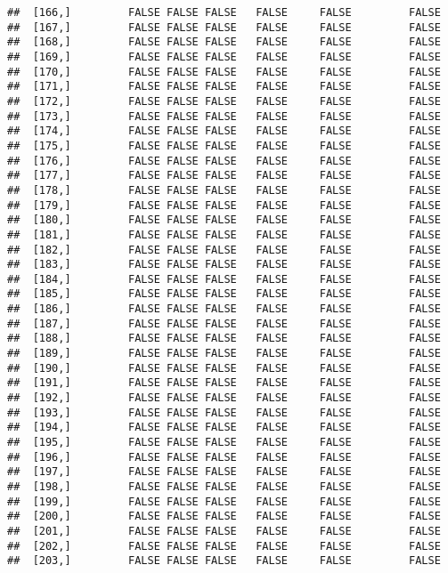 \documentclass[
]{article}
\begin{document}
\begin{verbatim}
##  [166,]         FALSE FALSE FALSE   FALSE     FALSE         FALSE
##  [167,]         FALSE FALSE FALSE   FALSE     FALSE         FALSE
##  [168,]         FALSE FALSE FALSE   FALSE     FALSE         FALSE
##  [169,]         FALSE FALSE FALSE   FALSE     FALSE         FALSE
##  [170,]         FALSE FALSE FALSE   FALSE     FALSE         FALSE
##  [171,]         FALSE FALSE FALSE   FALSE     FALSE         FALSE
##  [172,]         FALSE FALSE FALSE   FALSE     FALSE         FALSE
##  [173,]         FALSE FALSE FALSE   FALSE     FALSE         FALSE
##  [174,]         FALSE FALSE FALSE   FALSE     FALSE         FALSE
##  [175,]         FALSE FALSE FALSE   FALSE     FALSE         FALSE
##  [176,]         FALSE FALSE FALSE   FALSE     FALSE         FALSE
##  [177,]         FALSE FALSE FALSE   FALSE     FALSE         FALSE
##  [178,]         FALSE FALSE FALSE   FALSE     FALSE         FALSE
##  [179,]         FALSE FALSE FALSE   FALSE     FALSE         FALSE
##  [180,]         FALSE FALSE FALSE   FALSE     FALSE         FALSE
##  [181,]         FALSE FALSE FALSE   FALSE     FALSE         FALSE
##  [182,]         FALSE FALSE FALSE   FALSE     FALSE         FALSE
##  [183,]         FALSE FALSE FALSE   FALSE     FALSE         FALSE
##  [184,]         FALSE FALSE FALSE   FALSE     FALSE         FALSE
##  [185,]         FALSE FALSE FALSE   FALSE     FALSE         FALSE
##  [186,]         FALSE FALSE FALSE   FALSE     FALSE         FALSE
##  [187,]         FALSE FALSE FALSE   FALSE     FALSE         FALSE
##  [188,]         FALSE FALSE FALSE   FALSE     FALSE         FALSE
##  [189,]         FALSE FALSE FALSE   FALSE     FALSE         FALSE
##  [190,]         FALSE FALSE FALSE   FALSE     FALSE         FALSE
##  [191,]         FALSE FALSE FALSE   FALSE     FALSE         FALSE
##  [192,]         FALSE FALSE FALSE   FALSE     FALSE         FALSE
##  [193,]         FALSE FALSE FALSE   FALSE     FALSE         FALSE
##  [194,]         FALSE FALSE FALSE   FALSE     FALSE         FALSE
##  [195,]         FALSE FALSE FALSE   FALSE     FALSE         FALSE
##  [196,]         FALSE FALSE FALSE   FALSE     FALSE         FALSE
##  [197,]         FALSE FALSE FALSE   FALSE     FALSE         FALSE
##  [198,]         FALSE FALSE FALSE   FALSE     FALSE         FALSE
##  [199,]         FALSE FALSE FALSE   FALSE     FALSE         FALSE
##  [200,]         FALSE FALSE FALSE   FALSE     FALSE         FALSE
##  [201,]         FALSE FALSE FALSE   FALSE     FALSE         FALSE
##  [202,]         FALSE FALSE FALSE   FALSE     FALSE         FALSE
##  [203,]         FALSE FALSE FALSE   FALSE     FALSE         FALSE

\end{verbatim}
\end{document}
